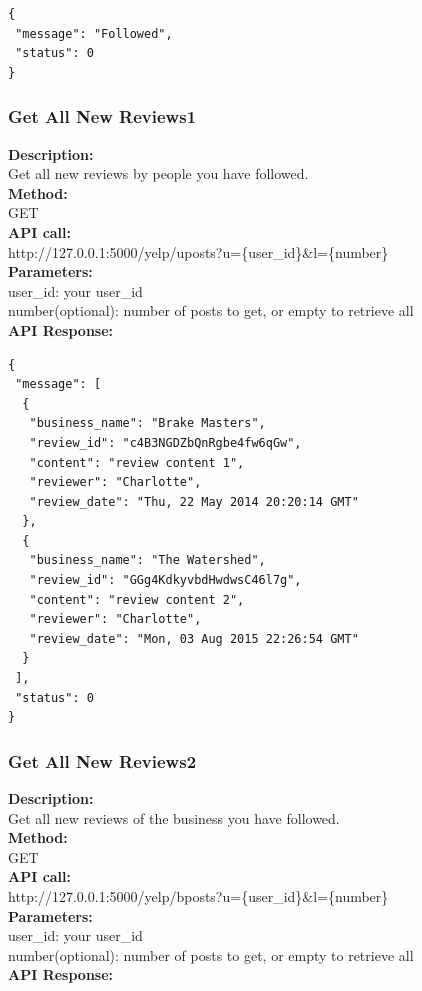 \documentclass[12pt]{article}
\begin{document}
\begin{singlespacing}
\begin{lstlisting}
{
 "message": "Followed",
 "status": 0
}
\end{lstlisting}
\end{singlespacing}

\subsubsection{Get All New Reviews1}
\textbf{Description:}\\
Get all new reviews by people you have followed.\\
\textbf{Method:}\\
GET\\
\textbf{API call:}\\ 
http://127.0.0.1:5000/yelp/uposts?u=\{user\_id\}\&l=\{number\}\\
\textbf{Parameters:}\\
user\_id: your user\_id\\
number(optional): number of posts to get, or empty to retrieve all\\
\textbf{API Response:}

\begin{singlespacing}
\begin{lstlisting}
{
 "message": [
  {
   "business_name": "Brake Masters",
   "review_id": "c4B3NGDZbQnRgbe4fw6qGw",
   "content": "review content 1",
   "reviewer": "Charlotte",
   "review_date": "Thu, 22 May 2014 20:20:14 GMT"
  },
  {
   "business_name": "The Watershed",
   "review_id": "GGg4KdkyvbdHwdwsC46l7g",
   "content": "review content 2",
   "reviewer": "Charlotte",
   "review_date": "Mon, 03 Aug 2015 22:26:54 GMT"
  }
 ],
 "status": 0
}
\end{lstlisting}
\end{singlespacing}

\subsubsection{Get All New Reviews2}
\textbf{Description:}\\
Get all new reviews of the business you have followed.\\
\textbf{Method:}\\
GET\\
\textbf{API call:}\\ 
http://127.0.0.1:5000/yelp/bposts?u=\{user\_id\}\&l=\{number\}\\
\textbf{Parameters:}\\
user\_id: your user\_id\\
number(optional): number of posts to get, or empty to retrieve all\\
\textbf{API Response:}
\end{document}
